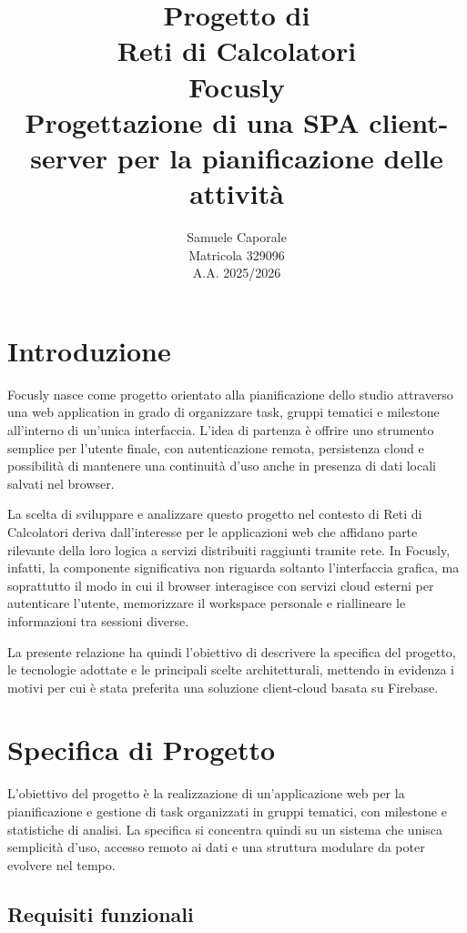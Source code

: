 \documentclass[11pt,a4paper]{article}
\title{
    \textbf{Progetto di\\ Reti di Calcolatori}\\[1.2cm]
    {\large \textbf{Focusly}\\[0.5cm] Progettazione di una SPA client-server per la pianificazione delle attività}
}
\author{
    Samuele Caporale\\
    Matricola 329096\\
    A.A. 2025/2026
}
\date{}
\begin{document}
\maketitle
\clearpage
\tableofcontents
\newpage

\section{Introduzione}

Focusly nasce come progetto orientato alla pianificazione dello studio attraverso una web application in grado di organizzare task, gruppi tematici e milestone all'interno di un'unica interfaccia. L'idea di partenza è offrire uno strumento semplice per l'utente finale, con autenticazione remota, persistenza cloud e possibilità di mantenere una continuità d'uso anche in presenza di dati locali salvati nel browser.

La scelta di sviluppare e analizzare questo progetto nel contesto di Reti di Calcolatori deriva dall'interesse per le applicazioni web che affidano parte rilevante della loro logica a servizi distribuiti raggiunti tramite rete. In Focusly, infatti, la componente significativa non riguarda soltanto l'interfaccia grafica, ma soprattutto il modo in cui il browser interagisce con servizi cloud esterni per autenticare l'utente, memorizzare il workspace personale e riallineare le informazioni tra sessioni diverse.

La presente relazione ha quindi l'obiettivo di descrivere la specifica del progetto, le tecnologie adottate e le principali scelte architetturali, mettendo in evidenza i motivi per cui è stata preferita una soluzione client-cloud basata su Firebase.

\section{Specifica di Progetto}

\par L'obiettivo del progetto è la realizzazione di un'applicazione web per la pianificazione e gestione di task organizzati in gruppi tematici, con milestone e statistiche di analisi. La specifica si concentra quindi su un sistema che unisca semplicità d'uso, accesso remoto ai dati e una struttura modulare da poter evolvere nel tempo.

\subsection{Requisiti funzionali}
\end{document}
